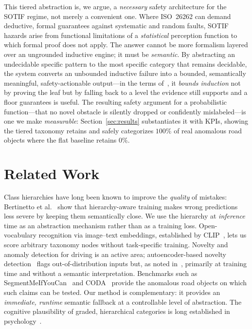 \documentclass[conference]{IEEEtran}
\begin{document}
This tiered abstraction is, we argue, a \emph{necessary} safety architecture for
the SOTIF regime, not merely a convenient one. Where ISO~26262 can demand
deductive, formal guarantees against systematic and random faults, SOTIF hazards
arise from functional limitations of a \emph{statistical} perception function to
which formal proof does not apply. The answer cannot be more formalism layered
over an ungrounded inductive engine; it must be \emph{semantic}. By abstracting an
undecidable specific pattern to the most specific category that remains decidable,
the system converts an unbounded inductive failure into a bounded, semantically
meaningful, safety-actionable output---in the terms of~\cite{schaller_patterns},
it \emph{bounds induction} not by proving the leaf but by falling back to a level
the evidence still supports and a floor guarantees is useful. The resulting safety
argument for a probabilistic function---that no novel obstacle is silently dropped
or confidently mislabeled---is one we make \emph{measurable}: Section~\ref{sec:results}
substantiates it with KPIs, showing the tiered taxonomy retains and safely
categorizes $100\%$ of real anomalous road objects where the flat baseline retains
$0\%$.

\section{Related Work}
\label{sec:related}

Class hierarchies have long been known to improve the \emph{quality} of
mistakes: Bertinetto et al.~\cite{bertinetto2020} show that hierarchy-aware
training makes wrong predictions less severe by keeping them semantically close.
We use the hierarchy at \emph{inference} time as an abstraction mechanism rather
than as a training loss. Open-vocabulary recognition via image--text embeddings,
established by CLIP~\cite{radford2021}, lets us score arbitrary taxonomy nodes
without task-specific training. Novelty and anomaly detection for driving is an
active area; autoencoder-based novelty detection~\cite{sedeh2021} flags
out-of-distribution inputs but, as noted in~\cite{schaller2025}, primarily at
training time and without a semantic interpretation. Benchmarks such as
SegmentMeIfYouCan~\cite{chan2021} and CODA~\cite{li2022} provide the anomalous
road objects on which such claims can be tested. Our method is complementary: it
provides an \emph{immediate, runtime} semantic fallback at a controllable level
of abstraction. The cognitive plausibility of graded, hierarchical categories is
long established in psychology~\cite{rosch1975}.
\end{document}

